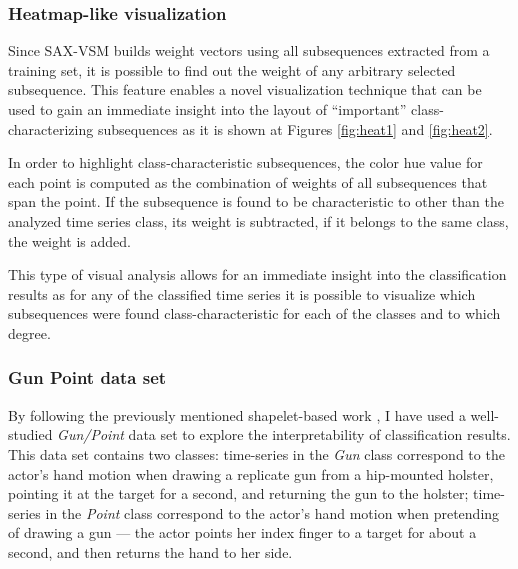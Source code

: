 \subsubsection{Heatmap-like visualization}
Since SAX-VSM builds \tfidf weight vectors using all subsequences extracted from a
training set, it is possible to find out the weight of any arbitrary selected subsequence.
This feature enables a novel visualization technique that can be used to gain an immediate
insight into the layout of ``important'' class-characterizing subsequences as it is shown at Figures
\ref{fig:heat1} and \ref{fig:heat2}.

In order to highlight class-characteristic subsequences, the color hue value for each point is computed as the combination of 
\tfidf weights of all subsequences that span the point. If the subsequence is found to be characteristic to other than the 
analyzed time series class, its weight is subtracted, if it belongs to the same class, the weight is added. 

This type of visual analysis allows for an immediate insight into the classification results as for any of the classified 
time series it is possible to visualize which subsequences were found class-characteristic for each of the classes and to 
which degree.

\subsubsection{Gun Point data set}
By following the previously mentioned shapelet-based work \cite{citeulike:7344347} \cite{citeulike:11345338}, 
I have used a well-studied \textit{\mbox{Gun/Point}} data set \cite{Ratanamahatana04makingtime-series} to explore the 
interpretability of classification results. This data set contains two classes: 
time-series in the \textit{Gun} class correspond to the actor's hand motion when drawing
a replicate gun from a hip-mounted holster, pointing it at the target for a second, and returning the gun to the holster; 
time-series in the \textit{Point} class correspond to the actor's hand motion when pretending
of drawing a gun --- the actor points her index finger to a target for about a second, and then returns the 
hand to her side. 

